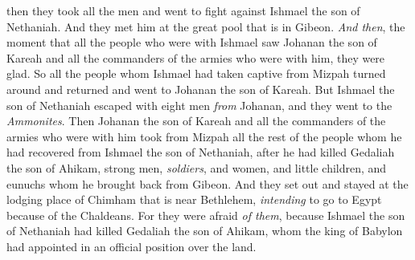 \begin{biblechapter}
\verse then they took all the men and went to fight against Ishmael the son of Nethaniah. And they met him at the great pool that is in Gibeon.
\verse \textit{And then}, the moment that all the people who were with Ishmael saw Johanan the son of Kareah and all the commanders of the armies who were with him, they were glad.
\verse So all the people whom Ishmael had taken captive from Mizpah turned around and returned and went to Johanan the son of Kareah.
\verse But Ishmael the son of Nethaniah escaped with eight men \textit{from} Johanan, and they went to the \textit{Ammonites}.
\verse Then Johanan the son of Kareah and all the commanders of the armies who were with him took from Mizpah all the rest of the people whom he had recovered from Ishmael the son of Nethaniah, after he had killed Gedaliah the son of Ahikam, strong men, \textit{soldiers}, and women, and little children, and eunuchs whom he brought back from Gibeon.
\verse And they set out and stayed at the lodging place of Chimham that is near Bethlehem, \textit{intending} to go to Egypt
\verse because of the Chaldeans. For they were afraid \textit{of them}, because Ishmael the son of Nethaniah had killed Gedaliah the son of Ahikam, whom the king of Babylon had appointed in an official position over the land.
\end{biblechapter}

